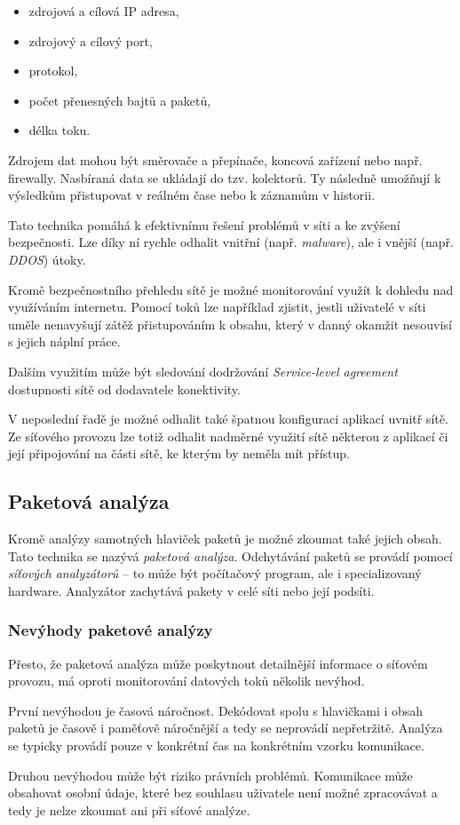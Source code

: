 \begin{itemize}
    \item zdrojová a cílová IP adresa,
    \item zdrojový a cílový port,
    \item protokol,
    \item počet přenesných bajtů a paketů,
    \item délka toku.
\end{itemize}

Zdrojem dat mohou být směrovače a přepínače, koncová zařízení nebo např. firewally.
Nasbíraná data se ukládají do tzv. kolektorů.
Ty následně umožňují k výsledkům přistupovat v reálném čase nebo k záznamům v historii.

Tato technika pomáhá k efektivnímu řešení problémů v síti a ke zvýšení bezpečnosti.
Lze díky ní rychle odhalit vnitřní (např. \textit{malware}), ale i vnější (např. \textit{DDOS}) útoky.

Kromě bezpečnostního přehledu sítě je možné monitorování využít k dohledu nad využíváním internetu.
Pomocí toků lze například zjistit, jestli uživatelé v síti uměle nenavyšují zátěž přistupováním k obsahu, který v danný okamžit nesouvisí s jejich náplní práce.

Dalším využitím může být sledování dodržování \textit{Service-level agreement} dostupnosti sítě od dodavatele konektivity.

V neposlední řadě je možné odhalit také špatnou konfiguraci aplikací uvnitř sítě.
Ze síťového provozu lze totiž odhalit nadměrné využití sítě některou z aplikací či její připojování na části sítě, ke kterým by neměla mít přístup.

\subsection{Paketová analýza}

Kromě analýzy samotných hlaviček paketů je možné zkoumat také jejich obsah.
Tato technika se nazývá \textit{paketová analýza}.
Odchytávání paketů se provádí pomocí \textit{síťových analyzátorů} -- to může být počítačový program, ale i specializovaný hardware.
Analyzátor zachytává pakety v celé síti nebo její podsíti.

\subsubsection*{Nevýhody paketové analýzy}
Přesto, že paketová analýza může poskytnout detailnější informace o síťovém provozu, má oproti monitorování datových toků několik nevýhod.

První nevýhodou je časová náročnost.
Dekódovat spolu s hlavičkami i obsah paketů je časově i paměťově náročnější a tedy se neprovádí nepřetržitě.
Analýza se typicky provádí pouze v konkrétní čas na konkrétním vzorku komunikace.

Druhou nevýhodou může být riziko právních problémů.
Komunikace může obsahovat osobní údaje, které bez souhlasu uživatele není možné zpracovávat a tedy je nelze zkoumat ani při síťové analýze.
